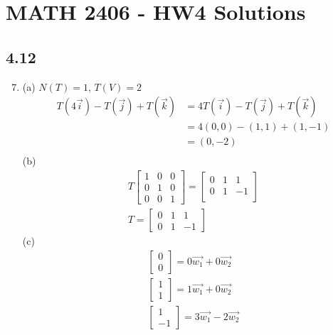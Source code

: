 \documentclass[a4paper, 12pt]{article}
\begin{document}
	\section*{MATH 2406 - HW4 Solutions}
	
	\subsection*{4.12}
	\begin{enumerate}
		\setcounter{enumi}{6}
		\item (a) $N(T) = 1$, $T(V) = 2$
		\begin{align*}
			T(4\vec{i}) - T(\vec{j}) + T(\vec{k}) &= 4T(\vec{i}) - T(\vec{j}) + T(\vec{k}) \\
			&= 4(0, 0) - (1, 1) + (1, -1) \\
			&= (0, -2) \\
		\end{align*}
		(b)
		\begin{gather*}
		T \left[ \begin{array}{ccc}
		1 & 0 & 0 \\
		0 & 1 & 0 \\
		0 & 0 & 1 \end{array} \right]
		= \left[ \begin{array}{ccc}
		0 & 1 & 1 \\
		0 & 1 & -1 \\
		\end{array} \right] \\
		T = \left[ \begin{array}{ccc}
		0 & 1 & 1 \\
		0 & 1 & -1 \end{array} \right]
		\end{gather*}
		(c)
		\begin{gather*}
		\left[ \begin{array}{c}
		0 \\
		0 \end{array} \right] = 0\vec{w_1} + 0\vec{w_2} \\
		\left[ \begin{array}{c}
		1 \\
		1 \end{array} \right] = 1\vec{w_1} + 0\vec{w_2} \\
		\left[ \begin{array}{c}
		1 \\
		-1 \end{array} \right] = 3\vec{w_1} - 2\vec{w_2} \\

\end{gather*}
\end{enumerate}
\end{document}
